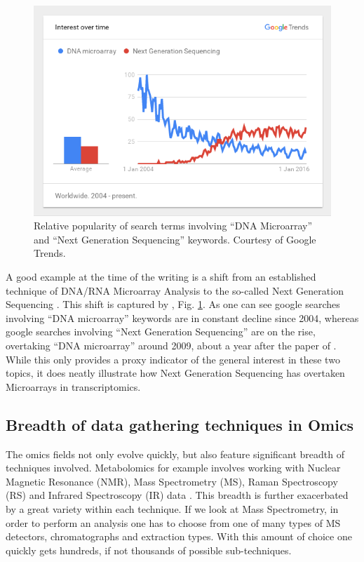 \begin{figure}[ht]
	\centering
	\includegraphics[width=135mm]{MicroarrayVSSequencing.png}
    \caption{Relative popularity of search terms involving ``DNA Microarray'' and ``Next Generation Sequencing'' keywords. Courtesy of Google Trends.}
    \label{microVsSeq}
\end{figure}


A good example at the time of the writing is a shift from an established technique of DNA/RNA Microarray Analysis to the so-called Next Generation Sequencing \parencite{Mardis2008}. This shift is captured by \textcite{GoogleTrends}, Fig. \ref{microVsSeq}. As one can see google searches involving ``DNA microarray'' keywords are in constant decline since 2004, whereas google searches involving ``Next Generation Sequencing'' are on the rise, overtaking ``DNA microarray'' around 2009, about a year after the paper of \textcite{Mardis2008}. While this only provides a proxy indicator of the general interest in these two topics, it does neatly illustrate how Next Generation Sequencing has overtaken Microarrays in transcriptomics.

\subsection{Breadth of data gathering techniques in Omics}

The omics fields not only evolve quickly, but also feature significant breadth of techniques involved. Metabolomics for example involves working with Nuclear Magnetic Resonance (NMR), Mass Spectrometry (MS), Raman Spectroscopy (RS) and Infrared Spectroscopy (IR) data \parencite{Madsen2010}. This breadth is further exacerbated by a great variety within each technique. If we look at Mass Spectrometry, in order to perform an analysis one has to choose from one of many types of MS detectors, chromatographs and extraction types. With this amount of choice one quickly gets hundreds, if not thousands of possible sub-techniques.

